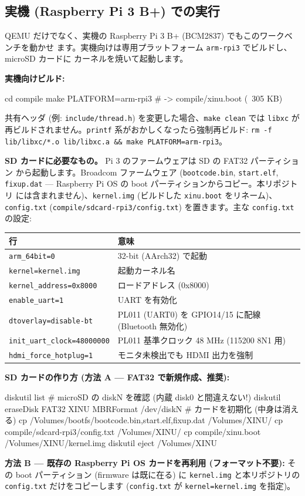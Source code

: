 \documentclass[a4paper,11pt]{ltjsarticle}
\begin{document}
\subsection{実機 (Raspberry Pi 3 B+) での実行}
QEMU だけでなく、実機の Raspberry Pi 3 B+ (BCM2837) でもこのワークベンチを動かせ
ます。実機向けは専用プラットフォーム \verb|arm-rpi3| でビルドし、microSD カードに
カーネルを焼いて起動します。

\textbf{実機向けビルド:}
\begin{code}
cd compile
make PLATFORM=arm-rpi3        # -> compile/xinu.boot (~305 KB)
\end{code}
共有ヘッダ (例: \verb|include/thread.h|) を変更した場合、\verb|make clean| では
\verb|libxc| が再ビルドされません。\verb|printf| 系がおかしくなったら強制再ビルド:
\verb|rm -f lib/libxc/*.o lib/libxc.a && make PLATFORM=arm-rpi3|。

\textbf{SD カードに必要なもの。} Pi 3 のファームウェアは SD の FAT32 パーティション
から起動します。Broadcom ファームウェア (\verb|bootcode.bin|, \verb|start.elf|,
\verb|fixup.dat| --- Raspberry Pi OS の boot パーティションからコピー。本リポジトリ
には含まれません)、\verb|kernel.img| (ビルドした \verb|xinu.boot| をリネーム)、
\verb|config.txt| (\verb|compile/sdcard-rpi3/config.txt|) を置きます。主な
\verb|config.txt| の設定:
\begin{center}\footnotesize
\begin{tabular}{@{}l p{8.0cm}@{}}
\toprule \textbf{行} & \textbf{意味}\\ \midrule
\verb|arm_64bit=0|           & 32-bit (AArch32) で起動\\
\verb|kernel=kernel.img|     & 起動カーネル名\\
\verb|kernel_address=0x8000| & ロードアドレス (0x8000)\\
\verb|enable_uart=1|         & UART を有効化\\
\verb|dtoverlay=disable-bt|  & PL011 (UART0) を GPIO14/15 に配線 (Bluetooth 無効化)\\
\verb|init_uart_clock=48000000| & PL011 基準クロック 48 MHz (115200 8N1 用)\\
\verb|hdmi_force_hotplug=1|  & モニタ未検出でも HDMI 出力を強制\\
\bottomrule
\end{tabular}
\end{center}

\textbf{SD カードの作り方 (方法 A --- FAT32 で新規作成、推奨):}
\begin{code}
diskutil list                                        # microSD の diskN を確認 (内蔵 disk0 と間違えない!)
diskutil eraseDisk FAT32 XINU MBRFormat /dev/diskN   # カードを初期化 (中身は消える)
cp /Volumes/bootfs/{bootcode.bin,start.elf,fixup.dat} /Volumes/XINU/
cp compile/sdcard-rpi3/config.txt /Volumes/XINU/
cp compile/xinu.boot /Volumes/XINU/kernel.img
diskutil eject /Volumes/XINU
\end{code}
\textbf{方法 B --- 既存の Raspberry Pi OS カードを再利用 (フォーマット不要):} その
boot パーティション (firmware は既に在る) に \verb|kernel.img| と本リポジトリの
\verb|config.txt| だけをコピーします (\verb|config.txt| が \verb|kernel=kernel.img|
を指定)。
\end{document}
